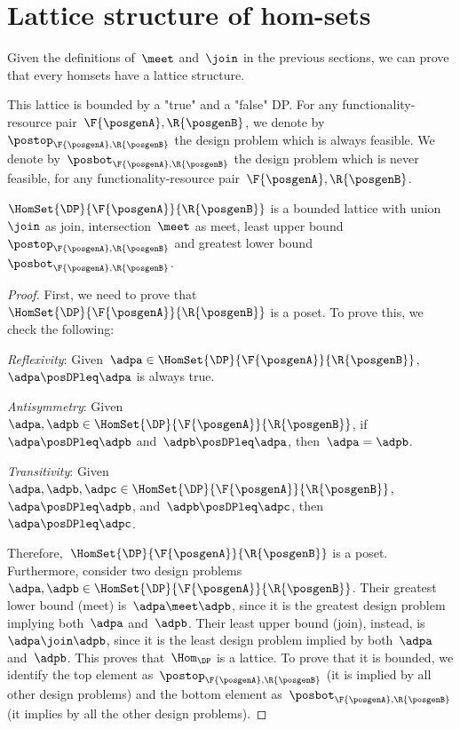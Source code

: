 \section{Lattice structure of \DP hom-sets}

Given the definitions of~$\meet$ and~$\join$ in the previous sections, we can prove that
every \DP homsets have a lattice structure.

This lattice is bounded by a "true" and a "false" DP.
For any functionality-resource pair~$\F{\posgenA},\R{\posgenB}$, we denote by~$\postop_{\F{\posgenA},\R{\posgenB}}$ the design problem which is always feasible.
We denote by~$\posbot_{\F{\posgenA},\R{\posgenB}}$ the design problem which is never feasible, for any functionality-resource pair~$\F{\posgenA},\R{\posgenB}$.

\begin{lemma}
    \label{lem:dpboundedlattice}
    $\HomSet{\DP}{\F{\posgenA}}{\R{\posgenB}}$ is a bounded lattice with union~$\join$ as join, intersection~$\meet$ as meet, least upper bound~$\postop_{\F{\posgenA},\R{\posgenB}}$ and greatest lower bound~$\posbot_{\F{\posgenA},\R{\posgenB}}$.
\end{lemma}

\begin{proof}
    First, we need to prove that~$\HomSet{\DP}{\F{\posgenA}}{\R{\posgenB}}$ is a poset.
    To prove this, we check the following:
    \begin{compactitem}
        \item \emph{Reflexivity}: Given~$\adpa\in \HomSet{\DP}{\F{\posgenA}}{\R{\posgenB}}$,~$\adpa\posDPleq \adpa$ is always true.
        \item \emph{Antisymmetry}: Given~$\adpa,\adpb\in \HomSet{\DP}{\F{\posgenA}}{\R{\posgenB}}$, if~$\adpa\posDPleq \adpb$ and~$\adpb\posDPleq \adpa$, then~$\adpa=\adpb$.
        \item \emph{Transitivity}: Given~$\adpa,\adpb,\adpc\in \HomSet{\DP}{\F{\posgenA}}{\R{\posgenB}}$,~$\adpa\posDPleq \adpb$, and~$\adpb\posDPleq \adpc$, then~$\adpa\posDPleq \adpc$.
    \end{compactitem}
    Therefore,~$\HomSet{\DP}{\F{\posgenA}}{\R{\posgenB}}$ is a poset.
    Furthermore, consider two design problems~$\adpa,\adpb\in \HomSet{\DP}{\F{\posgenA}}{\R{\posgenB}}$.
    Their greatest lower bound (meet) is~$\adpa\meet\adpb$, since it is the greatest design problem implying both~$\adpa$ and~$\adpb$.
    Their least upper bound (join), instead, is~$\adpa\join \adpb$, since it is the least design problem implied by both~$\adpa$ and~$\adpb$.
    This proves that~$\Hom_\DP$ is a lattice.
    To prove that it is bounded, we identify the top element as~$\postop_{\F{\posgenA},\R{\posgenB}}$ (it is implied by all other design problems) and the bottom element as~$\posbot_{\F{\posgenA},\R{\posgenB}}$ (it implies by all the other design problems).
\end{proof}

